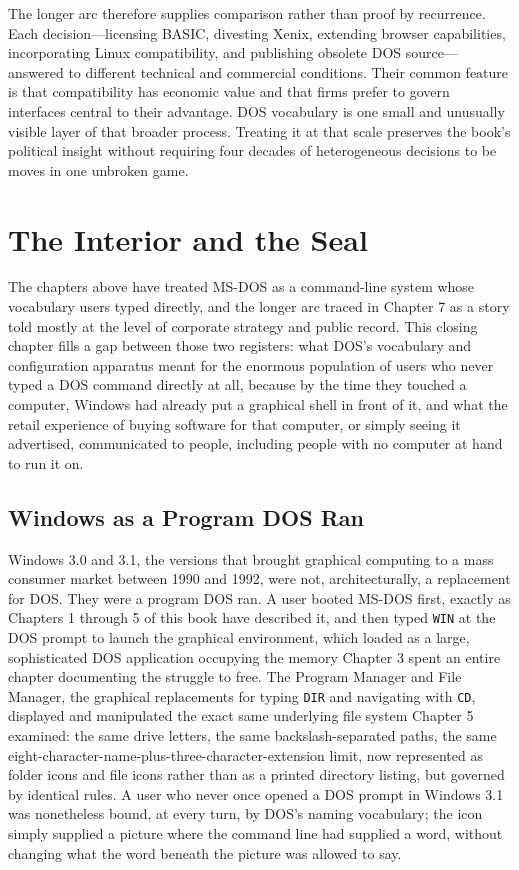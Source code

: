 \documentclass[11pt]{book}
\begin{document}
The longer arc therefore supplies comparison rather than proof by recurrence. Each decision---licensing BASIC, divesting Xenix, extending browser capabilities, incorporating Linux compatibility, and publishing obsolete DOS source---answered to different technical and commercial conditions. Their common feature is that compatibility has economic value and that firms prefer to govern interfaces central to their advantage. DOS vocabulary is one small and unusually visible layer of that broader process. Treating it at that scale preserves the book's political insight without requiring four decades of heterogeneous decisions to be moves in one unbroken game.

\chapter{The Interior and the Seal}

The chapters above have treated MS-DOS as a command-line system whose vocabulary users typed directly, and the longer arc traced in Chapter 7 as a story told mostly at the level of corporate strategy and public record. This closing chapter fills a gap between those two registers: what DOS's vocabulary and configuration apparatus meant for the enormous population of users who never typed a DOS command directly at all, because by the time they touched a computer, Windows had already put a graphical shell in front of it, and what the retail experience of buying software for that computer, or simply seeing it advertised, communicated to people, including people with no computer at hand to run it on.

\section{Windows as a Program DOS Ran}

Windows 3.0 and 3.1, the versions that brought graphical computing to a mass consumer market between 1990 and 1992, were not, architecturally, a replacement for DOS. They were a program DOS ran. A user booted MS-DOS first, exactly as Chapters 1 through 5 of this book have described it, and then typed \texttt{WIN} at the DOS prompt to launch the graphical environment, which loaded as a large, sophisticated DOS application occupying the memory Chapter 3 spent an entire chapter documenting the struggle to free. The Program Manager and File Manager, the graphical replacements for typing \texttt{DIR} and navigating with \texttt{CD}, displayed and manipulated the exact same underlying file system Chapter 5 examined: the same drive letters, the same backslash-separated paths, the same eight-character-name-plus-three-character-extension limit, now represented as folder icons and file icons rather than as a printed directory listing, but governed by identical rules. A user who never once opened a DOS prompt in Windows 3.1 was nonetheless bound, at every turn, by DOS's naming vocabulary; the icon simply supplied a picture where the command line had supplied a word, without changing what the word beneath the picture was allowed to say.
\end{document}
